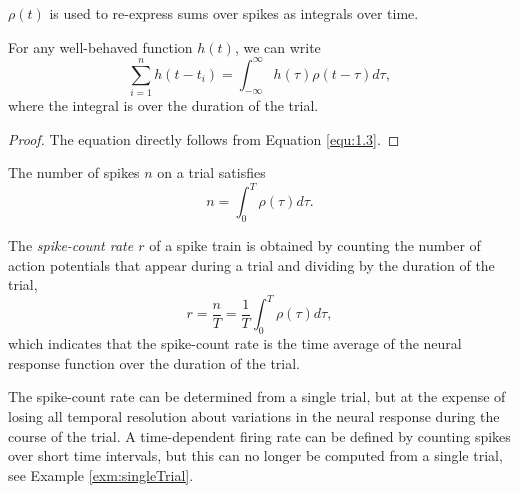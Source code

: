 \begin{rem}
  $\rho(t)$ is used to re-express sums over spikes as integrals over time.
\end{rem}

\begin{thm}
  \label{thm:sumToIntegral}
  For any well-behaved function $h(t)$, we can write
  \begin{equation}
    \label{equ:1.2}
    \sum_{i=1}^n h(t-t_i)=\int_{-\infty}^{\infty}h(\tau)\rho(t-\tau)d\tau,
  \end{equation}
  where the integral is over the duration of the trial.
  \begin{proof}
    The equation directly follows from Equation \ref{equ:1.3}.
  \end{proof}
\end{thm}

\begin{prop}
  \label{prop:numberOfSpikes}
  The number of spikes $n$ on a trial satisfies
  \begin{displaymath}
    n = \int_0^{T}\rho(\tau) d\tau.
  \end{displaymath}
\end{prop}

\begin{defn}
  The \emph{spike-count rate $r$} of a spike train is obtained by counting the number of action potentials that appear during a trial and dividing by the duration of the trial,
  \begin{equation}
    r=\frac{n}{T}=\frac{1}{T}\int_0^T\rho(\tau)d\tau,
  \end{equation}
  which indicates that the spike-count rate is the time average of the neural response function over the  duration of the trial.
\end{defn}


\begin{rem}
  The spike-count rate can be determined from a single trial, but at the expense of 
  losing all temporal resolution about variations in the neural response during the 
  course of the trial. A time-dependent firing rate can be defined by counting spikes 
  over short time intervals, but this can no longer
be computed from a single trial, see Example \ref{exm:singleTrial}.
\end{rem}

